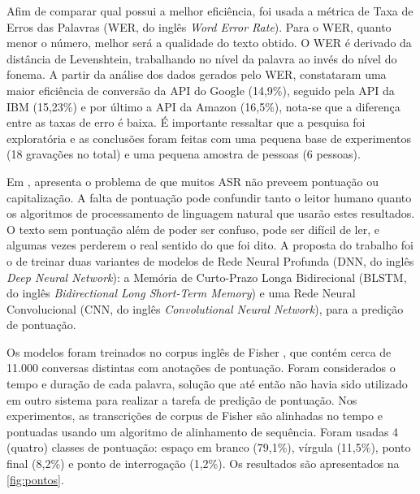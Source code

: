 Afim de comparar qual possui a melhor eficiência, foi usada a métrica de Taxa de Erros das Palavras (WER, do inglês \textit{Word Error Rate}). Para o WER, quanto menor o número, melhor será a qualidade do texto obtido. O WER é derivado da distância de Levenshtein, trabalhando no nível da palavra ao invés do nível do fonema. A partir da análise dos dados gerados pelo WER, constataram uma maior eficiência de conversão da API do Google (14,9\%), seguido pela API da IBM (15,23\%) e por último a API da Amazon (16,5\%), nota-se que a diferença entre as taxas de erro é baixa. É importante ressaltar que a pesquisa foi exploratória e as conclusões foram feitas com uma pequena base de experimentos (18 gravações no total) e uma pequena amostra de pessoas (6 pessoas).



Em , apresenta o problema de que muitos ASR não preveem pontuação ou capitalização. A falta de pontuação pode confundir tanto o leitor humano quanto os algoritmos de processamento de linguagem natural que usarão estes resultados. O texto sem pontuação além de poder ser confuso, pode ser difícil de ler, e algumas vezes perderem o real sentido do que foi dito. 
A proposta do trabalho foi o de treinar duas variantes de modelos de Rede Neural Profunda (DNN, do inglês \textit{Deep Neural Network}): a Memória de Curto-Prazo Longa Bidirecional (BLSTM, do inglês \textit{Bidirectional Long Short-Term Memory}) e uma Rede Neural Convolucional (CNN, do inglês \textit{Convolutional Neural Network}), para a predição de pontuação. 


Os modelos foram treinados no corpus inglês de Fisher \cite{cieri2004fisher}, que contém cerca de 11.000 conversas distintas com  anotações de pontuação. Foram considerados o tempo e duração de cada palavra, solução que até então não havia sido utilizado em outro sistema para realizar a tarefa de predição de pontuação. Nos experimentos, as transcrições de corpus de Fisher são alinhadas no tempo e pontuadas usando um algoritmo de alinhamento de sequência. Foram usadas 4 (quatro) classes de pontuação: espaço em branco (79,1\%), vírgula (11,5\%), ponto final (8,2\%) e ponto de interrogação (1,2\%). Os resultados são apresentados na \autoref{fig:pontos}.



